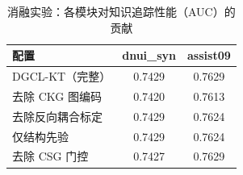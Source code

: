 \begin{table}[htbp]
\centering
\caption{消融实验：各模块对知识追踪性能（AUC）的贡献}
\label{tab:ablation}
\begin{tabular}{lcc}
\toprule
配置 & dnui_syn & assist09 \\
\midrule
DGCL-KT（完整） & 0.7429 & 0.7629 \\
去除 CKG 图编码 & 0.7420 & 0.7613 \\
去除反向耦合标定 & 0.7429 & 0.7624 \\
仅结构先验 & 0.7429 & 0.7624 \\
去除 CSG 门控 & 0.7427 & 0.7629 \\
\bottomrule
\end{tabular}
\end{table}